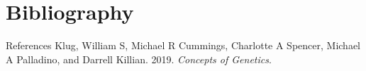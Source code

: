 \documentclass[11pt,dvipsnames,ignorenonframetext,aspectratio=169]{beamer}
\newlength{\cslhangindent}
\newenvironment{CSLReferences}%
  {\setlength{\parindent}{0pt}%
  \everypar{\setlength{\hangindent}{\cslhangindent}}\ignorespaces}%
  {\par}
\begin{document}
\begin{frame}{}
\begin{figure}
\begin{columns}[T,onlytextwidth]
\label{fig:pcr}
\end{columns}
\end{figure}
\end{frame}

\hypertarget{bibliography}{%
\section{Bibliography}\label{bibliography}}

\begin{frame}{References}
\protect\hypertarget{references}{}
\hypertarget{refs}{}
\begin{CSLReferences}{1}{0}
\leavevmode{}%
Klug, William S, Michael R Cummings, Charlotte A Spencer, Michael A
Palladino, and Darrell Killian. 2019. \emph{Concepts of Genetics}.

\end{CSLReferences}
\end{frame}
\end{document}
